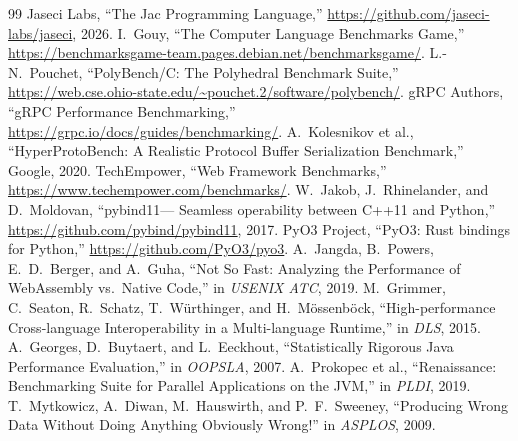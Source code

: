 \documentclass[conference]{IEEEtran}
\begin{document}
\begin{thebibliography}{99}
 Jaseci Labs, ``The Jac Programming Language,''
\url{https://github.com/jaseci-labs/jaseci}, 2026.
 I.\ Gouy, ``The Computer Language Benchmarks Game,''
\url{https://benchmarksgame-team.pages.debian.net/benchmarksgame/}.
 L.-N.\ Pouchet, ``PolyBench/C: The Polyhedral Benchmark
Suite,'' \url{https://web.cse.ohio-state.edu/~pouchet.2/software/polybench/}.
 gRPC Authors, ``gRPC Performance Benchmarking,''
\url{https://grpc.io/docs/guides/benchmarking/}.
 A.\ Kolesnikov et al., ``HyperProtoBench: A Realistic
Protocol Buffer Serialization Benchmark,'' Google, 2020.
 TechEmpower, ``Web Framework Benchmarks,''
\url{https://www.techempower.com/benchmarks/}.
 W.\ Jakob, J.\ Rhinelander, and D.\ Moldovan, ``pybind11---%
Seamless operability between C++11 and Python,''
\url{https://github.com/pybind/pybind11}, 2017.
 PyO3 Project, ``PyO3: Rust bindings for Python,''
\url{https://github.com/PyO3/pyo3}.
 A.\ Jangda, B.\ Powers, E.\ D.\ Berger, and A.\ Guha, ``Not So
Fast: Analyzing the Performance of WebAssembly vs.\ Native Code,'' in
\emph{USENIX ATC}, 2019.
 M.\ Grimmer, C.\ Seaton, R.\ Schatz, T.\ W\"urthinger, and
H.\ M\"ossenb\"ock, ``High-performance Cross-language Interoperability in a
Multi-language Runtime,'' in \emph{DLS}, 2015.
 A.\ Georges, D.\ Buytaert, and L.\ Eeckhout,
``Statistically Rigorous Java Performance Evaluation,'' in \emph{OOPSLA}, 2007.
 A.\ Prokopec et al., ``Renaissance: Benchmarking Suite
for Parallel Applications on the JVM,'' in \emph{PLDI}, 2019.
 T.\ Mytkowicz, A.\ Diwan, M.\ Hauswirth, and
P.\ F.\ Sweeney, ``Producing Wrong Data Without Doing Anything Obviously
Wrong!'' in \emph{ASPLOS}, 2009.
\end{thebibliography}
\end{document}
